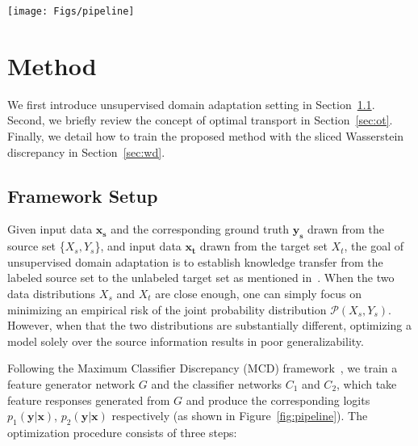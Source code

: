 \documentclass[10pt,twocolumn,letterpaper]{article}
\begin{document}
\begin{figure*}
\begin{center}
\texttt{[image: Figs/pipeline]}
\end{center}
\vspace{-5mm}
   \caption{An illustration of the proposed sliced Wasserstein discrepancy (SWD) computation. The SWD is designed to capture the dissimilarity of probability measures $p_1$ and $p_2$ in $\mathbb{R}^d$ between the task-specific classifiers $C_1$ and $C_2$, which take input from feature generator $G$. The SWD enables end-to-end training directly through a variational formulation of Wasserstein metric using radial projections on the uniform measures on the unit sphere $\mathcal{S}^{d-1}$, providing a geometrically meaningful guidance to detect target samples that are far from the support of the source. Please refer to Section~\ref{sec:wd} for details.}
\label{fig:pipeline}
\end{figure*}


\section{Method}
We first introduce unsupervised domain adaptation setting in Section~\ref{sec:setting}. Second, we briefly review the concept of optimal transport in Section~\ref{sec:ot}. Finally, we detail how to train the proposed method with the sliced Wasserstein discrepancy in Section~\ref{sec:wd}. 

\subsection{Framework Setup}
\label{sec:setting}

Given input data $\mathbf{x_{s}}$ and the corresponding ground truth $\mathbf{y_{s}}$ drawn from the source set \{$X_{s}, Y_{s}$\}, and input data $\mathbf{x_{t}}$ drawn from the target set $X_{t}$, the goal of unsupervised domain adaptation is to establish knowledge transfer from the labeled source set to the unlabeled target set as mentioned in~\cite{pan2010survey}.
 When the two data distributions $X_{s}$ and $X_{t}$ are close enough, one can simply focus on minimizing an empirical risk of the joint probability distribution $\mathcal{P} (X_{s}, Y_{s})$. However, when that the two distributions are substantially different, optimizing a model solely over the source information results in poor generalizability.

Following the Maximum Classifier Discrepancy (MCD) framework~\cite{saito2017maximum}, we train a feature generator network $G$ and
the classifier networks $C_1$ and $C_2$, which take feature responses generated from $G$ and produce the corresponding logits $p_1(\mathbf{y}|\mathbf{x})$, $p_2(\mathbf{y}|\mathbf{x})$ respectively (as shown in Figure~\ref{fig:pipeline}).
The optimization procedure consists of three steps:
\end{document}
